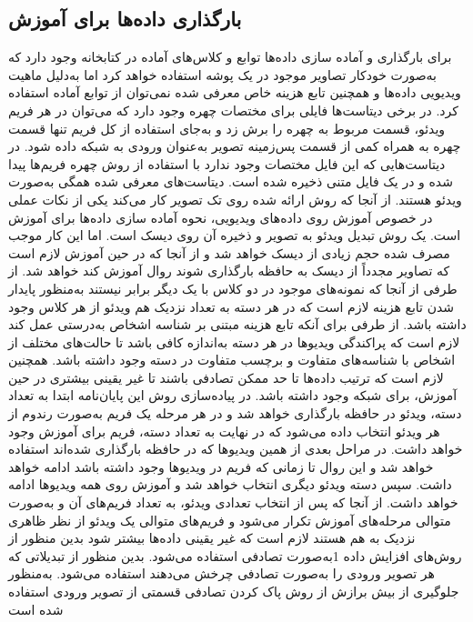 \subsection{بارگذاری داده‌ها برای آموزش}
برای بارگذاری و آماده سازی داده‌ها توابع و کلاس‌های آماده در کتابخانه  وجود دارد که به‌صورت خودکار تصاویر موجود در یک پوشه استفاده خواهد کرد اما به‌دلیل ماهیت ویدیویی داده‌ها و همچنین تابع هزینه خاص معرفی شده نمی‌توان از توابع آماده استفاده کرد.
در برخی دیتاست‌ها فایلی برای مختصات چهره وجود دارد که می‌توان در هر فریم ویدئو، قسمت مربوط به چهره را برش زد و به‌جای استفاده از کل فریم تنها قسمت چهره به همراه کمی از قسمت پس‌زمینه تصویر به‌عنوان ورودی به شبکه داده شود. در دیتاست‌هایی که این فایل مختصات وجود ندارد با استفاده از روش 
\cite{zhang2016joint}
 چهره فریم‌ها پیدا شده و در یک فایل متنی ذخیره شده است.
دیتاست‌های معرفی شده همگی به‌صورت ویدئو هستند. از آنجا که روش ارائه شده روی تک تصویر کار می‌کند یکی از نکات عملی در خصوص آموزش روی داده‌های ویدیویی، نحوه آماده سازی داده‌ها برای آموزش است. یک روش تبدیل ویدئو به تصویر و ذخیره آن روی دیسک است. اما این کار موجب مصرف شده حجم زیادی از دیسک خواهد شد و از آنجا که در حین آموزش لازم است که تصاویر مجدداً از دیسک به حافظه  بارگذاری شوند روال آموزش کند خواهد شد.
از طرفی از آنجا که نمونه‌های موجود در دو کلاس با یک دیگر برابر نیستند به‌منظور پایدار شدن تابع هزینه  لازم است که در هر دسته به تعداد نزدیک هم ویدئو از هر کلاس وجود داشته باشد. از طرفی برای آنکه تابع هزینه مبتنی بر شناسه اشخاص به‌درستی عمل کند لازم است که پراکندگی ویدیوها در هر دسته به‌اندازه کافی باشد تا حالت‌های مختلف از اشخاص با شناسه‌های متفاوت و برچسب متفاوت در دسته وجود داشته باشد. همچنین لازم است که ترتیب داده‌ها تا حد ممکن تصادفی باشند تا غیر یقینی بیشتری در حین آموزش، برای شبکه وجود داشته باشد. 
در پیاده‌سازی روش این پایان‌نامه ابتدا به تعداد دسته، ویدئو در حافظه  بارگذاری خواهد شد و در هر مرحله یک فریم به‌صورت رندوم از هر ویدئو انتخاب داده می‌شود که در نهایت به تعداد دسته، فریم برای آموزش وجود خواهد داشت. در مراحل بعدی از همین ویدیوها که در حافظه  بارگذاری شده‌اند استفاده خواهد شد و این روال تا زمانی که فریم در ویدیوها وجود داشته باشد ادامه خواهد داشت. سپس دسته ویدئو دیگری انتخاب خواهد شد و آموزش روی همه ویدیوها ادامه خواهد داشت. 
از آنجا که پس از انتخاب تعدادی ویدئو، به تعداد فریم‌های آن و به‌صورت متوالی مرحله‌های آموزش تکرار می‌شود و فریم‌های متوالی یک ویدئو از نظر ظاهری نزدیک به هم هستند لازم است که غیر یقینی داده‌ها بیشتر شود بدین منظور از روش‌های افزایش داده 1به‌صورت تصادفی استفاده می‌شود. بدین منظور از تبدیلاتی که هر تصویر ورودی را به‌صورت تصادفی چرخش می‌دهند استفاده می‌شود. 
به‌منظور جلوگیری از بیش برازش از روش پاک کردن تصادفی قسمتی از تصویر ورودی استفاده شده است 
